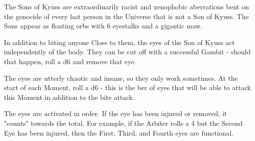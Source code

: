 {\MONSTERBLOCK[
  Name=Son of Kyuss,
  Link=monster-son-of kyuss,
  MV=Base,
  WK=d6,
  DMG=2d10 1 Close,
  HD=8,
  Power=Weak,
  Soak=0,
  Morale=Orderly,
  Save=5,
  Extras={Berserk, Keen}
]

The Sons of Kyuss are extraordinarily racist and xenophobic aberrations bent on the genocide of every last person in the Universe that is not a Son of Kyuss.  The Sons appear as floating orbs with 6 eyestalks and a gigantic maw.

In addition to biting anyone Close to them, the eyes of the Son of Kyuss act independently of the body.  They can be cut off with a successful Gambit - should that happen, roll a d6 and remove that eye.

The eyes are utterly chaotic and insane, so they only work sometimes.  At the start of each Moment, roll a d6 - this is the ber of eyes that will be able to attack this Moment in addition to the bite attack.



The eyes are activated in order.  If the eye has been injured or removed, it "counts" towards the total.  For example, if the Arbiter rolls a 4 but the Second Eye has been injured, then the First, Third, and Fourth eyes are functional.

\newpage



\MONSTERBLOCK[
  Name=Giant Toad,
  Link=monster-giant-toad,
  MV=Base,
  WK=d24,
  DMG=d4 1 Nearby,
  HD=1,
  Power=Average,
  Soak=1,
  Morale=Orderly,
  Save=1,
  Extras={Leaper}
]

}
